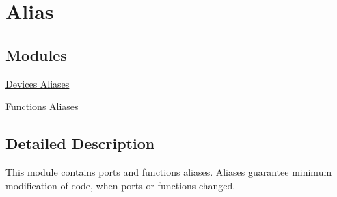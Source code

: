 \hypertarget{group___ala}{\section{Alias}
\label{group___ala}
}
\subsection*{Modules}
\begin{DoxyCompactItemize}
\item 
\hyperlink{group___dev_ala}{Devices Aliases}
\item 
\hyperlink{group___func_ala}{Functions Aliases}
\end{DoxyCompactItemize}


\subsection{Detailed Description}
This module contains ports and functions aliases. Aliases guarantee minimum modification of code, when ports or functions changed. 